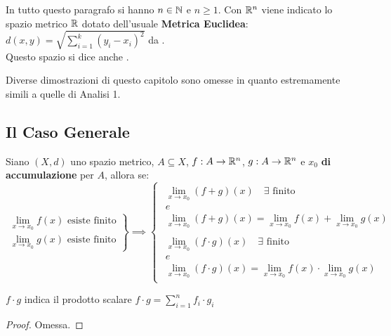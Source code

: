 In tutto questo paragrafo si hanno $n \in \mathbb{N}$ e $n \geq 1$. Con $\mathbb{R}^n$ viene indicato lo spazio metrico $\mathbb{R}$ dotato dell'usuale \textbf{Metrica Euclidea}: $d(x,y) = \sqrt{\sum\limits_{i = 1}^{k} (y_i - x_i)^2}$ da .\\
Questo spazio si dice anche .
\begin{note}
	Diverse dimostrazioni di questo capitolo sono omesse in quanto estremamente simili a quelle di Analisi 1.
\end{note}

\subsection{Il Caso Generale}
\begin{proposition}
	\label{prop:lim_in_R_somma_prod}
	Siano $(X,d)$ uno spazio metrico, $A \subseteq X$, $f:A \to \mathbb{R}^n$, $g:A \to \mathbb{R}^n$ e $x_0$ \textbf{di accumulazione} per $A$, allora se:
	\begin{equation*}
		\left.
		\begin{array}{r}
			\lim\limits_{x \to x_0} f(x) \text{ esiste finito}\\
			\lim\limits_{x \to x_0} g(x) \text{ esiste finito}
		\end{array}
		\right\}
		\implies
		\begin{cases}
			\begin{array}{c}
				\lim\limits_{x \to x_0} (f + g)(x) \quad \exists \text{ finito}\\[-1ex]
				e\\[-1ex]
				\lim\limits_{x \to x_0} (f + g)(x) = \lim\limits_{x \to x_0} f(x) + \lim\limits_{x \to x_0} g(x)\\
				\\
				\lim\limits_{x \to x_0} (f \cdot g)(x) \quad \exists \text{ finito}\\[-1ex]
				e\\
				\lim\limits_{x \to x_0} (f \cdot g)(x) = \lim\limits_{x \to x_0} f(x) \cdot \lim\limits_{x \to x_0} g(x)
			\end{array}
		\end{cases}
	\end{equation*}
	\begin{note}
		$f \cdot g$ indica il prodotto scalare $f \cdot g = \sum\limits_{i = 1}^{n} f_i \cdot g_i$
	\end{note}
	\begin{proof}
		Omessa.
	\end{proof}
\end{proposition}
